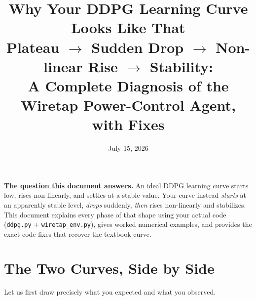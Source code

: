 \documentclass[11pt]{article}
\title{\textbf{Why Your DDPG Learning Curve Looks Like That}\\[2mm]
\large Plateau $\rightarrow$ Sudden Drop $\rightarrow$ Non-linear Rise $\rightarrow$ Stability:\\
A Complete Diagnosis of the Wiretap Power-Control Agent, with Fixes}
\author{}
\date{July 15, 2026}
\begin{document}
\maketitle
\vspace{-8mm}

\begin{center}
\begin{tcolorbox}[colback=softgray,colframe=black!40,width=0.92\textwidth]
\small \textbf{The question this document answers.} An ideal DDPG learning curve
starts low, rises non-linearly, and settles at a stable value. Your curve instead
\emph{starts} at an apparently stable level, \emph{drops} suddenly, \emph{then} rises
non-linearly and stabilizes. This document explains every phase of that shape using
your actual code (\texttt{ddpg.py} + \texttt{wiretap\_env.py}), gives worked numerical
examples, and provides the exact code fixes that recover the textbook curve.
\end{tcolorbox}
\end{center}

\tableofcontents

\section{The Two Curves, Side by Side}

Let us first draw precisely what you expected and what you observed.
\end{document}
